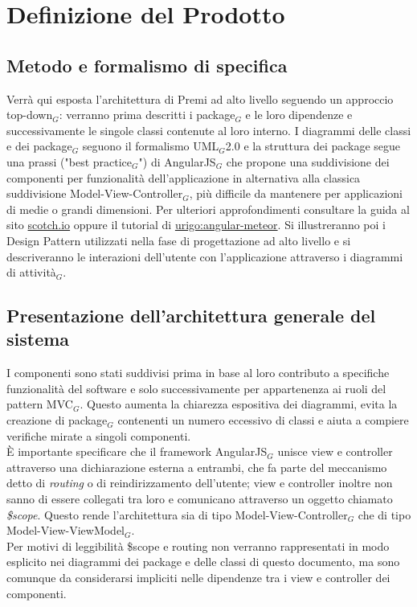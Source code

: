 \newpage
\section{Definizione del Prodotto}

\subsection{Metodo e formalismo di specifica}
Verrà qui esposta l'architettura di Premi ad alto livello seguendo un approccio top-down$_G$: verranno prima descritti i package$_G$ e le loro dipendenze e successivamente le singole classi contenute al loro interno. I diagrammi delle classi e dei package$_G$ seguono il formalismo UML$_G$2.0 e la struttura dei package segue una prassi ("best practice$_G$") di AngularJS$_G$ che propone una suddivisione dei componenti per funzionalità dell'applicazione in alternativa alla classica suddivisione Model-View-Controller$_G$, più difficile da mantenere per applicazioni di medie o grandi dimensioni. Per ulteriori approfondimenti consultare la guida al sito \href{https://scotch.io/tutorials/angularjs-best-practices-directory-structure}{scotch.io} oppure il tutorial di \href{http://angular-meteor.com/tutorial/step_07}{urigo:angular-meteor}.
Si illustreranno poi i Design Pattern utilizzati nella fase di progettazione ad alto livello e si descriveranno le interazioni dell'utente con l'applicazione attraverso i diagrammi di attività$_G$.


\subsection{Presentazione dell'architettura generale del sistema}

I componenti sono stati suddivisi prima in base al loro contributo a specifiche funzionalità del software e solo successivamente per appartenenza ai ruoli del pattern MVC$_G$. Questo aumenta la chiarezza espositiva dei diagrammi, evita la creazione di package$_G$ contenenti un numero eccessivo di classi e aiuta a compiere verifiche mirate a singoli componenti. \\
È importante specificare che il framework AngularJS$_G$ unisce view e controller attraverso una dichiarazione esterna a entrambi, che fa parte del meccanismo detto di \textit{routing} o di reindirizzamento dell'utente; view e controller inoltre non sanno di essere collegati tra loro e comunicano attraverso un oggetto chiamato \textit{\$scope}. Questo rende l'architettura sia di tipo Model-View-Controller$_G$ che di tipo Model-View-ViewModel$_G$. \\
Per motivi di leggibilità \$scope e routing non verranno rappresentati in modo esplicito nei diagrammi dei package e delle classi di questo documento, ma sono comunque da considerarsi impliciti nelle dipendenze tra i view e controller dei componenti. \\
